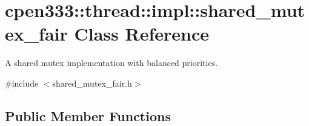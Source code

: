 \hypertarget{classcpen333_1_1thread_1_1impl_1_1shared__mutex__fair}{}\section{cpen333\+:\+:thread\+:\+:impl\+:\+:shared\+\_\+mutex\+\_\+fair Class Reference}
\label{classcpen333_1_1thread_1_1impl_1_1shared__mutex__fair}


A shared mutex implementation with balanced priorities.  




{\ttfamily \#include $<$shared\+\_\+mutex\+\_\+fair.\+h$>$}

\subsection*{Public Member Functions}
